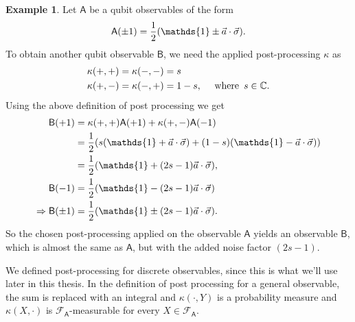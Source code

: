 \documentclass[a4paper,12pt]{wihuri}
\theoremstyle{definition}
\newtheorem{example}{Example}
\numberwithin{definition}{section}
\numberwithin{example}{section}
\numberwithin{theorem}{section}
\numberwithin{proposition}{section}
\numberwithin{lemma}{section}
\newcommand{\salg}{\mathcal{F}}%
\newcommand{\A}{\mathsf{A}}%
\newcommand{\B}{\mathsf{B}}%
\newcommand{\id}{\mathds{1}}
\begin{document}
\begin{example}
Let $\A$ be a qubit observables of the form
\begin{align*}
\A(\pm 1) = \dfrac{1}{2}(\id \pm \vec{a}\cdot\vec{\sigma})\text. 
\end{align*}
To obtain another qubit observable $\B$, we need the applied post-processing $\kappa$ as
\begin{align*}
\kappa(+,+) = \kappa(-,-) &= s \\
\kappa(+,-) = \kappa(-,+) &= 1-s,\quad\text{ where }\,s\in \mathbb{C}\text.
\end{align*}
Using the above definition of post processing we get
\begin{align*}
\B(+1) &= \kappa(+,+)\A(+1) + \kappa(+,-)\A(-1) \\
&=\frac{1}{2}(s(\id + \vec{a}\cdot\vec{\sigma}) + (1-s)(\id - \vec{a}\cdot\vec{\sigma}))\\
&=\frac{1}{2}(\id + (2s-1)\vec{a}\cdot\vec{\sigma}),\\
\B(-1) &= \dfrac{1}{2}(\id - (2s-1)\vec{a}\cdot\vec{\sigma})\\
\Rightarrow \B(\pm 1) &= \frac{1}{2}(\id \pm (2s-1)\vec{a}\cdot\vec{\sigma})\text.
\end{align*}
So the chosen post-processing applied on the observable $\A$ yields an observable $\B$, which is almost the same as $\A$, but with the added noise factor $(2s-1)$. 


\end{example}

We defined post-processing for discrete observables, since this is what we'll use later in this thesis. In the definition of post processing for a general observable, the sum is replaced with an integral and $\kappa(\cdot, Y)$ is a probability measure and $\kappa(X, \cdot)$ is $\salg_\A$-measurable for every $X\in\salg_\A$.


\end{document}
